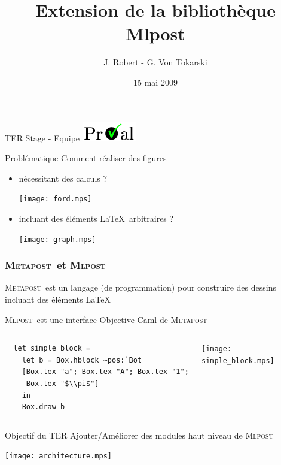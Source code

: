 \documentclass{beamer}
\title{Extension de la bibliothèque Mlpost}
\author{J. Robert - G. Von Tokarski}
\date{15 mai 2009}
\newcommand{\mlpost}{\textsc{Mlpost}}
\newcommand{\meta}{\textsc{Metapost}}
\begin{document}
\begin{frame}
  \maketitle

  \begin{center}
    TER Stage - Equipe \includegraphics[scale=0.4]{proval.png}
  \end{center}
\end{frame}

\begin{frame}{Problématique}
  Comment réaliser des figures
  \begin{itemize}
  \item nécessitant des calculs ?
  \begin{center}
    \texttt{[image: ford.mps]}
  \end{center}

  \bigskip
  \item incluant des éléments \LaTeX\ arbitraires ?
    \bigskip
    \begin{center}
      \texttt{[image: graph.mps]}
    \end{center}
  \end{itemize}
\end{frame}

\begin{frame}[fragile]\frametitle{\meta\ et \mlpost}
  \meta\ est un langage (de programmation) pour construire des dessins incluant des éléments \LaTeX

  \bigskip
  \mlpost\ est une interface Objective Caml de \meta

  \bigskip
  \begin{columns}
    \small
    \begin{verbatim}
  let simple_block =
    let b = Box.hblock ~pos:`Bot 
    [Box.tex "a"; Box.tex "A"; Box.tex "1"; 
     Box.tex "$\\pi$"] 
    in
    Box.draw b
    \end{verbatim}
    \texttt{[image: simple\_block.mps]}
  \end{columns}
\end{frame}


\begin{frame}{Objectif du TER}
  Ajouter/Améliorer des modules haut niveau de \mlpost

  \vfill
  \begin{center}
    \texttt{[image: architecture.mps]}
  \end{center}

\end{frame}
\end{document}
